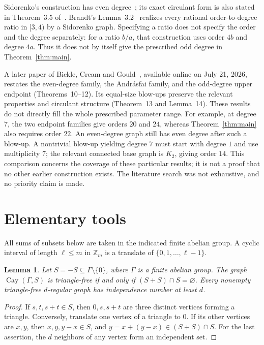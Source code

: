 \documentclass[11pt]{article}
\newtheorem{lemma}[theorem]{Lemma}
\newcommand{\Z}{\mathbb Z}
\newcommand{\Cay}{\operatorname{Cay}}
\begin{document}
Sidorenko's construction has even degree~\cite{Sidorenko1991};
its exact circulant form is also stated in Theorem~3.5
of~\cite{Ayat2020}.
Brandt's Lemma~3.2~\cite{Brandt2010} realizes every rational
order-to-degree ratio in \([3,4)\) by a Sidorenko graph.
Specifying a ratio does not specify the order and the degree separately:
for a ratio \(b/a\), that construction uses order \(4b\) and degree \(4a\).
Thus it does not by itself give the prescribed odd degree in
Theorem~\ref{thm:main}.

A later paper of Bickle, Cream and Gould~\cite{Bickle2027},
available online on July 21, 2026, restates the even-degree family,
the Andr\'asfai family, and the odd-degree upper endpoint
(Theorems~10--12). Its equal-size blow-ups preserve the relevant
properties and circulant structure (Theorem~13 and Lemma~14).
These results do not directly fill the whole prescribed parameter range.
For example, at degree \(7\), the two endpoint families give orders \(20\)
and \(24\), whereas Theorem~\ref{thm:main} also requires order \(22\).
An even-degree graph still has even degree after such a blow-up.
A nontrivial blow-up yielding degree \(7\) must start with degree \(1\)
and use multiplicity \(7\); the relevant connected base graph is \(K_2\),
giving order \(14\).
This comparison concerns the coverage of these particular results;
it is not a proof that no other earlier construction exists.
The literature search was not exhaustive, and no priority claim is made.

\section{Elementary tools}

All sums of subsets below are taken in the indicated finite abelian group.
A cyclic interval of length \(\ell\le m\) in \(\Z_m\) is a translate
of \(\{0,1,\ldots,\ell-1\}\).

\begin{lemma}\label{lem:triangle}
Let \(S=-S\subseteq\Gamma\setminus\{0\}\), where \(\Gamma\) is a finite
abelian group. The graph \(\Cay(\Gamma,S)\) is triangle-free if and only if
\((S+S)\cap S=\varnothing\).
Every nonempty triangle-free \(d\)-regular graph has independence number
at least \(d\).
\end{lemma}
\begin{proof}
If \(s,t,s+t\in S\), then \(0,s,s+t\) are three distinct vertices forming
a triangle. Conversely, translate one vertex of a triangle to \(0\).
If its other vertices are \(x,y\), then \(x,y,y-x\in S\), and
\(y=x+(y-x)\in(S+S)\cap S\).
For the last assertion, the \(d\) neighbors of any vertex form an
independent set.
\end{proof}
\end{document}
